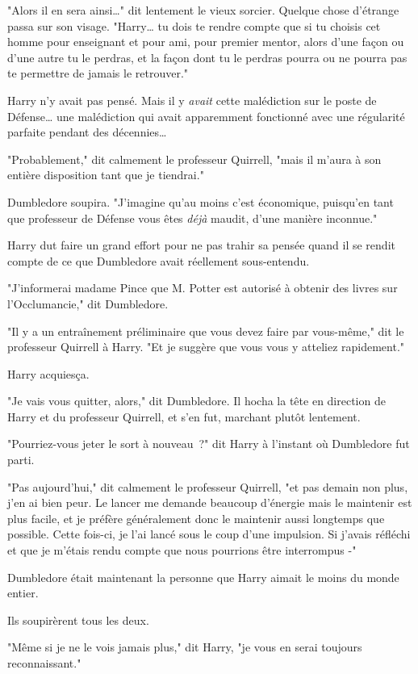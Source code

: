 "Alors il en sera ainsi…" dit lentement le vieux sorcier. Quelque chose d'étrange passa sur son visage. "Harry… tu dois te rendre compte que si tu choisis cet homme pour enseignant et pour ami, pour premier mentor, alors d'une façon ou d'une autre tu le perdras, et la façon dont tu le perdras pourra ou ne pourra pas te permettre de jamais le retrouver."

Harry n'y avait pas pensé. Mais il y \emph{avait} cette malédiction sur le poste de Défense… une malédiction qui avait apparemment fonctionné avec une régularité parfaite pendant des décennies…

"Probablement," dit calmement le professeur Quirrell, "mais il m'aura à son entière disposition tant que je tiendrai."

Dumbledore soupira. "J'imagine qu'au moins c'est économique, puisqu'en tant que professeur de Défense vous êtes \emph{déjà} maudit, d'une manière inconnue."

Harry dut faire un grand effort pour ne pas trahir sa pensée quand il se rendit compte de ce que Dumbledore avait réellement sous-entendu.

"J'informerai madame Pince que M. Potter est autorisé à obtenir des livres sur l'Occlumancie," dit Dumbledore.

"Il y a un entraînement préliminaire que vous devez faire par vous-même," dit le professeur Quirrell à Harry. "Et je suggère que vous vous y atteliez rapidement."

Harry acquiesça.

"Je vais vous quitter, alors," dit Dumbledore. Il hocha la tête en direction de Harry et du professeur Quirrell, et s'en fut, marchant plutôt lentement.

"Pourriez-vous jeter le sort à nouveau~?" dit Harry à l'instant où Dumbledore fut parti.

"Pas aujourd'hui," dit calmement le professeur Quirrell, "et pas demain non plus, j'en ai bien peur. Le lancer me demande beaucoup d'énergie mais le maintenir est plus facile, et je préfère généralement donc le maintenir aussi longtemps que possible. Cette fois-ci, je l'ai lancé sous le coup d'une impulsion. Si j'avais réfléchi et que je m'étais rendu compte que nous pourrions être interrompus -"

Dumbledore était maintenant la personne que Harry aimait le moins du monde entier.

Ils soupirèrent tous les deux.

"Même si je ne le vois jamais plus," dit Harry, "je vous en serai toujours reconnaissant."

